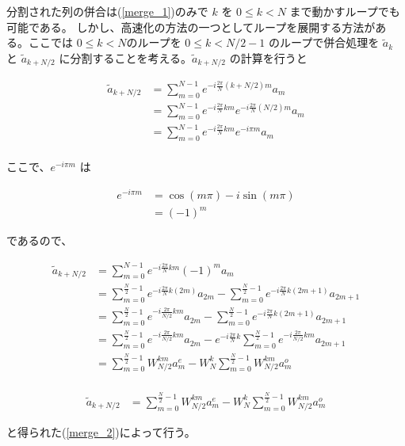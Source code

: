 分割された列の併合は(\ref{merge_1})のみで $k$ を $0 \le k < N$ まで動かすループでも可能である。
しかし、高速化の方法の一つとしてループを展開する方法がある。ここでは $0 \le k < N$のループを $0 \le k < N/2 - 1$ のループで併合処理を $\tilde{a}_k$ と $\tilde{a}_{k + N/2}$ に分割することを考える。$\tilde{a}_{k + N/2}$ の計算を行うと 



\begin{align*}
    \tilde{a}_{k + N/2} &= \sum_{m = 0}^{N - 1} e^{-i\frac{2\pi}{N} (k + N/2)m} a_m \\
                        &= \sum_{m = 0}^{N - 1} e^{-i\frac{2\pi}{N}km} e^{-i\frac{2\pi}{N}(N/2)m}  a_m \\
                        &= \sum_{m = 0}^{N - 1} e^{-i\frac{2\pi}{N}km} e^{-i\pi m}  a_m \\
\end{align*}

ここで、$e^{-i\pi m}$ は

\begin{align*}
    e^{-i\pi m} &= \cos(m\pi) - i\sin(m\pi)\\
                &= (-1)^m
\end{align*}

であるので、

\begin{align*}
    \tilde{a}_{k + N/2} &= \sum_{m = 0}^{N - 1} e^{-i\frac{2\pi}{N}km} (-1)^m a_m \\
                        &= \sum_{m = 0}^{\frac{N}{2} - 1} e^{-i\frac{2\pi}{N}k(2m)} a_{2m} 
                         - \sum_{m = 0}^{\frac{N}{2} - 1} e^{-i\frac{2\pi}{N}k(2m + 1)} a_{2m + 1} \\
                        &= \sum_{m = 0}^{\frac{N}{2} - 1} e^{-i\frac{2\pi}{N / 2}km} a_{2m} 
                         - \sum_{m = 0}^{\frac{N}{2} - 1} e^{-i\frac{2\pi}{N}k(2m + 1)} a_{2m + 1} \\
                        &= \sum_{m = 0}^{\frac{N}{2} - 1} e^{-i\frac{2\pi}{N / 2}km} a_{2m} 
                         - e^{-i\frac{2\pi}{N}k} \sum_{m = 0}^{\frac{N}{2} - 1} e^{-i\frac{2\pi}{N / 2}km} a_{2m + 1} \\
                        &= \sum_{m = 0}^{\frac{N}{2} - 1} W_{N/2}^{km} a^{e}_{m} 
                        - W_N^k \sum_{m = 0}^{\frac{N}{2} - 1} W_{N/2}^{km} a^{o}_{m} \\
\end{align*}

\begin{align}\label{merge_2}
    \tilde{a}_{k + N/2} &= \sum_{m = 0}^{\frac{N}{2} - 1} W_{N/2}^{km} a^{e}_{m} 
                        - W_N^k \sum_{m = 0}^{\frac{N}{2} - 1} W_{N/2}^{km} a^{o}_{m}
\end{align}

と得られた(\ref{merge_2})によって行う。
